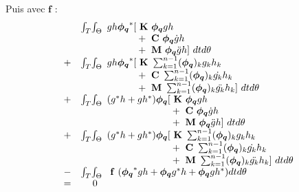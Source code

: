 Puis avec $\mathbf{f}$ :
\begin{equation}
\begin{array}{r r l}
	&\int_T \! \int_\Theta \!\!\!&		
		gh\boldsymbol{\phi_q}^*[~\mathbf{K}~\boldsymbol{\phi_q} gh
			\\ && \phantom{gh\boldsymbol{\phi_q}^*[ }
			+ ~\mathbf{C}~ \boldsymbol{\phi_q}  \dot{g}h
			\\ && \phantom{gh\boldsymbol{\phi_q}^*[ }
			+ ~\mathbf{M}~ \boldsymbol{\phi_q} \ddot{g}h
			] ~dt d\theta
	\\
	+ &\int_T \! \int_\Theta \!\!\!&		
		gh\boldsymbol{\phi_q}^*
			[ ~\mathbf{K}~ \sum_{k=1}^{n-1} (\boldsymbol{\phi_q})_k       g_k  h_k
			\\ && \phantom{gh\boldsymbol{\phi_q}^*[}
			+ ~\mathbf{C}~ \sum_{k=1}^{n-1} (\boldsymbol{\phi_q})_k  \dot{g_k} h_k 
			\\ && \phantom{gh\boldsymbol{\phi_q}^*[}
			+ ~\mathbf{M}~ \sum_{k=1}^{n-1} (\boldsymbol{\phi_q})_k \ddot{g_k} h_k 
			] ~dt d\theta
	\\
	+ &\int_T \! \int_\Theta \!\!\!&		
		(g^*h + gh^*)\boldsymbol{\phi_q}[~\mathbf{K}~ \boldsymbol{\phi_q}gh
			\\ && \phantom{(g^*h + gh^*)\boldsymbol{\phi_q}[ }
			+ ~\mathbf{C}~ \boldsymbol{\phi_q} \dot{g}h
			\\ && \phantom{(g^*h + gh^*)\boldsymbol{\phi_q}[ }
			+ ~\mathbf{M}~ \boldsymbol{\phi_q} \ddot{g}h
			] ~dt d\theta
	\\
	+ &\int_T \! \int_\Theta \!\!\!&
		(g^*h + gh^*)\boldsymbol{\phi_q}
			[ ~\mathbf{K}~ \sum_{k=1}^{n-1} (\boldsymbol{\phi_q})_k       g_k  h_k 
			\\ && \phantom{(g^*h + gh^*)\boldsymbol{\phi_q}[}
			+ ~\mathbf{C}~ \sum_{k=1}^{n-1} (\boldsymbol{\phi_q})_k  \dot{g_k} h_k 
			\\ && \phantom{(g^*h + gh^*)\boldsymbol{\phi_q}[}
			+ ~\mathbf{M}~ \sum_{k=1}^{n-1} (\boldsymbol{\phi_q})_k \ddot{g_k} h_k 
			] ~dt d\theta
	\\
	- &\int_T \! \int_\Theta \!\!\!&
		~\mathbf{f}~ (\boldsymbol{\phi_q}^*gh + \boldsymbol{\phi_q} g^*h + \boldsymbol{\phi_q} gh^*) dt d\theta
	\\
	= &0& 
\end{array}
\end{equation}

